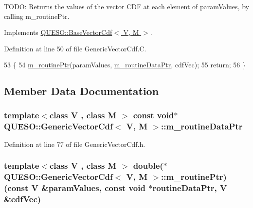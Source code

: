 T\-O\-D\-O\-: Returns the values of the vector C\-D\-F at each element of {\ttfamily param\-Values}, by calling {\ttfamily m\-\_\-routine\-Ptr}. 



Implements \hyperlink{class_q_u_e_s_o_1_1_base_vector_cdf_a30b15bde5a206071b4e4db26141ce179}{Q\-U\-E\-S\-O\-::\-Base\-Vector\-Cdf$<$ V, M $>$}.



Definition at line 50 of file Generic\-Vector\-Cdf.\-C.


\begin{DoxyCode}
53 \{
54   \hyperlink{class_q_u_e_s_o_1_1_generic_vector_cdf_a6ae0cb85626ec0d713ba4fbea621ffef}{m\_routinePtr}(paramValues, \hyperlink{class_q_u_e_s_o_1_1_generic_vector_cdf_adfdd6840459650b1f52fec7e42c5f8e6}{m\_routineDataPtr}, cdfVec);
55   \textcolor{keywordflow}{return};
56 \}
\end{DoxyCode}


\subsection{Member Data Documentation}
\hypertarget{class_q_u_e_s_o_1_1_generic_vector_cdf_adfdd6840459650b1f52fec7e42c5f8e6}{
\subsubsection[{m\-\_\-routine\-Data\-Ptr}]{\setlength{\rightskip}{0pt plus 5cm}template$<$class V , class M $>$ const void$\ast$ {\bf Q\-U\-E\-S\-O\-::\-Generic\-Vector\-Cdf}$<$ V, M $>$\-::m\-\_\-routine\-Data\-Ptr\hspace{0.3cm}{\ttfamily [protected]}}}\label{class_q_u_e_s_o_1_1_generic_vector_cdf_adfdd6840459650b1f52fec7e42c5f8e6}


Definition at line 77 of file Generic\-Vector\-Cdf.\-h.

\hypertarget{class_q_u_e_s_o_1_1_generic_vector_cdf_a6ae0cb85626ec0d713ba4fbea621ffef}{
\subsubsection[{m\-\_\-routine\-Ptr}]{\setlength{\rightskip}{0pt plus 5cm}template$<$class V , class M $>$ double($\ast$ {\bf Q\-U\-E\-S\-O\-::\-Generic\-Vector\-Cdf}$<$ V, M $>$\-::m\-\_\-routine\-Ptr)(const V \&param\-Values, const void $\ast$routine\-Data\-Ptr, V \&cdf\-Vec)\hspace{0.3cm}{\ttfamily [protected]}}}\label{class_q_u_e_s_o_1_1_generic_vector_cdf_a6ae0cb85626ec0d713ba4fbea621ffef}


